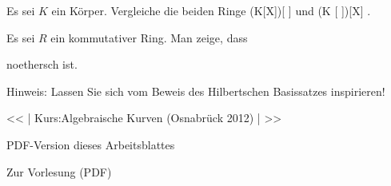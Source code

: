 
{}

{


Es sei $K$ ein Körper. Vergleiche die beiden Ringe
\mathkor {} {(K[X])[ \![Y]\! ]} {und} {(K [ \![ Y]\! ])[X]} {.}


}

{} {}



{}

{


Es sei $R$ ein
kommutativer Ring. Man zeige, dass

 noethersch ist.


}

{} {Hinweis: Lassen Sie sich vom Beweis des Hilbertschen Basissatzes inspirieren!}


<< | Kurs:Algebraische Kurven (Osnabrück 2012) | >>


PDF-Version dieses Arbeitsblattes


 Zur Vorlesung
(PDF)
